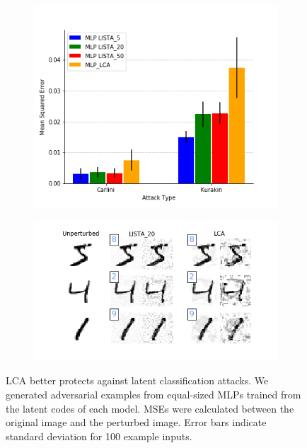 \begin{figure}[h]
\vskip -0.05in
  \begin{subfigure}
    \centering\includegraphics[width=\columnwidth]{Figures/latent_clf_attack_mse.png}
  \end{subfigure}
  \begin{subfigure}
    \centering\includegraphics[width=\columnwidth]{Figures/latent_clf_attack_ex.png}
  \end{subfigure}
\caption{LCA better protects against latent classification attacks. We generated adversarial examples from equal-sized MLPs trained from the latent codes of each model. MSEs were calculated between the original image and the perturbed image.   Error bars indicate standard deviation for 100 example inputs.}
\label{fig:latent_attac_mse}
\end{figure}

